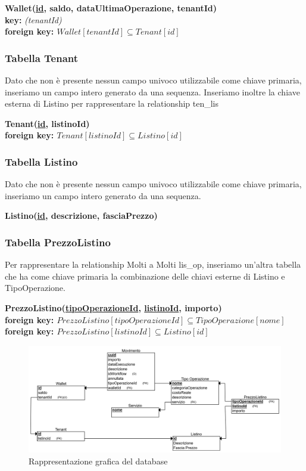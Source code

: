 \textbf{Wallet(\underline{id}, saldo, dataUltimaOperazione, tenantId) \\}
\textbf{\hspace*{1.5 cm} key:} \textit{(tenantId)} \\
\textbf{\hspace*{1.5 cm} foreign key: $ Wallet[tenantId] \subseteq Tenant[id] $}

\subsubsection{Tabella Tenant}
Dato che non \`e presente nessun campo univoco utilizzabile come chiave primaria, inseriamo un campo intero generato da una sequenza. Inseriamo inoltre la chiave esterna
di Listino per rappresentare la relationship ten\_lis

\textbf{Tenant(\underline{id}, listinoId) \\}
\textbf{\hspace*{1.5 cm} foreign key: $ Tenant[listinoId] \subseteq Listino[id] $}

\subsubsection{Tabella Listino}
Dato che non \`e presente nessun campo univoco utilizzabile come chiave primaria, inseriamo un campo intero generato da una sequenza.

\textbf{Listino(\underline{id}, descrizione, fasciaPrezzo)}

\subsubsection{Tabella PrezzoListino}
Per rappresentare la relationship Molti a Molti lis\_op, inseriamo un'altra tabella che ha come chiave primaria la combinazione delle chiavi esterne di Listino e TipoOperazione.

\textbf{PrezzoListino(\underline{tipoOperazioneId}, \underline{listinoId}, importo) \\}
\textbf{\hspace*{1.5 cm} foreign key: $ PrezzoListino[tipoOperazioneId] \subseteq TipoOperazione[nome] $} \\
\textbf{\hspace*{1.5 cm} foreign key: $ PrezzoListino[listinoId] \subseteq Listino[id] $}

\begin{figure}[H]
  \centering
  \includegraphics[width=13cm]{images/db-diagrams/rappresentazione-grafica-db.png}
  \caption{Rappresentazione grafica del database}
\end{figure}


